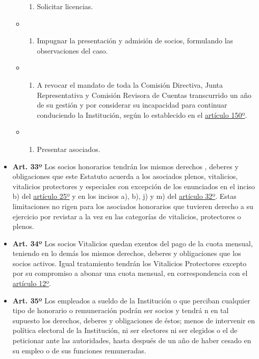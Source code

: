 \documentclass[]{book}
\providecommand{\tightlist}{%
  \setlength{\itemsep}{0pt}\setlength{\parskip}{0pt}}
\begin{document}
\begin{itemize}
\begin{itemize}
\begin{enumerate}
    \item
      Solicitar licencias.
    \end{enumerate}
  \item
    \begin{enumerate}
    \def\labelenumi{\alph{enumi})}
    \setcounter{enumi}{11}
    \tightlist
    \item
      Impugnar la presentación y admisión de socios, formulando las
      observaciones del caso.
    \end{enumerate}
  \item
    \begin{enumerate}
    \def\labelenumi{\alph{enumi})}
    \setcounter{enumi}{12}
    \tightlist
    \item
      A revocar el mandato de toda la Comisión Directiva, Junta
      Representativa y Comisión Revisora de Cuentas transcurrido un año
      de su gestión y por considerar su incapacidad para continuar
      conduciendo la Institución, según lo establecido en el
      \protect\hyperlink{art150}{artículo 150º}.
    \end{enumerate}
  \item
    \begin{enumerate}
    \def\labelenumi{\alph{enumi})}
    \setcounter{enumi}{13}
    \tightlist
    \item
      Presentar asociados.
    \end{enumerate}
  \end{itemize}
\item
  \textbf{Art. 33º} Los socios honorarios tendrán los mismos derechos ,
  deberes y obligaciones que este Estatuto acuerda a los asociados
  plenos, vitalicios, vitalicios protectores y especiales con excepción
  de los enunciados en el inciso b) del
  \protect\hyperlink{art25}{artículo 25º} y en los incisos a), b), j) y
  m) del \protect\hyperlink{art32}{artículo 32º}. Estas limitaciones no
  rigen para los asociados honorarios que tuvieren derecho a su
  ejercicio por revistar a la vez en las categorías de vitalicios,
  protectores o plenos.
\item
  \textbf{Art. 34º} Los socios Vitalicios quedan exentos del pago de la
  cuota mensual, teniendo en lo demás los mismos derechos, deberes y
  obligaciones que los socios activos. Igual tratamiento tendrán los
  Vitalicios Protectores excepto por su compromiso a abonar una cuota
  mensual, en correspondencia con el \protect\hyperlink{art12}{artículo
  12º}.
\item
  \textbf{Art. 35º} Los empleados a sueldo de la Institución o que
  perciban cualquier tipo de honorario o remuneración podrán ser socios
  y tendrá n en tal supuesto los derechos, deberes y obligaciones de
  éstos; menos de intervenir en política electoral de la Institución, ni
  ser electores ni ser elegidos o el de peticionar ante las autoridades,
  hasta después de un año de haber cesado en su empleo o de sus
  funciones remuneradas.
\end{itemize}
\end{document}
